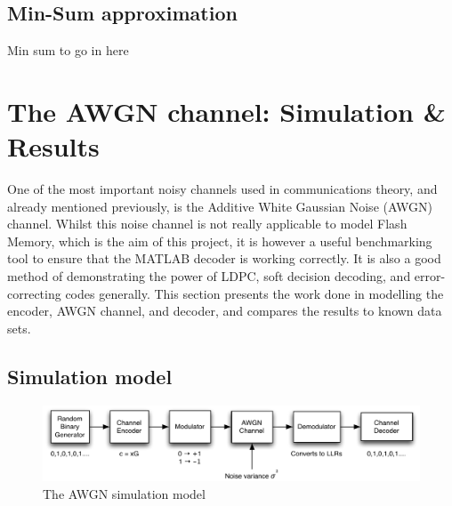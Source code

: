 \documentclass[11pt]{article}
\numberwithin{equation}{subsection}
\begin{document}
\subsection{Min-Sum approximation}

Min sum to go in here

\section{The AWGN channel: Simulation \& Results}
One of the most important noisy channels used in communications theory, and already mentioned previously, is the Additive White Gaussian Noise (AWGN) channel. Whilst this noise channel is not really applicable to model Flash Memory, which is the aim of this project, it is however a useful benchmarking tool to ensure that the MATLAB decoder is working correctly. It is also a good method of demonstrating the power of LDPC, soft decision decoding, and error-correcting codes generally. This section presents the work done in modelling the encoder, AWGN channel, and decoder, and compares the results to known data sets.

\subsection{Simulation model}
\begin{figure}[h]
\centering
\includegraphics[scale=0.878]{awgn_channel_model}
\caption{The AWGN simulation model}
\label{figure:awgn sim model}
\end{figure}
\end{document}
